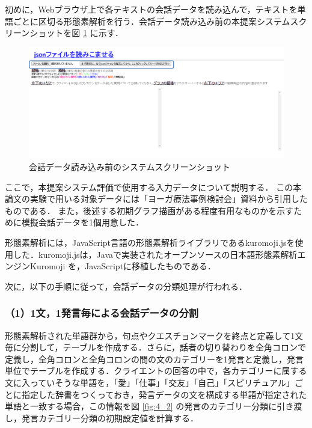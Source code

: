 \documentclass[shuuron]{kuee}
\begin{document}
初めに，Webブラウザ上で各テキストの会話データを読み込んで，テキストを単語ごとに区切る形態素解析を行う．会話データ読み込み前の本提案システムスクリーンショットを図
\ref{fig:yomikomimae2}
に示す．
\begin{figure}
  \begin{center}
    \includegraphics[width=\linewidth]{yomikomimae2.png}
  \end{center}
  \caption{会話データ読み込み前のシステムスクリーンショット}
  \label{fig:yomikomimae2}
\end{figure}

ここで，本提案システム評価で使用する入力データについて説明する．
この本論文の実験で用いる対象データには「ヨーガ療法事例検討会」資料から引用したものである．
また，後述する初期グラフ描画がある程度有用なものかを示すために模擬会話データを1個用意した．

形態素解析には，JavaScript言語の形態素解析ライブラリであるkuromoji.js\cite{kuromojijs}を使用した．kuromoji.jsは，Javaで実装されたオープンソースの日本語形態素解析エンジンKuromoji
\cite{kuromoji}
を，JavaScriptに移植したものである．

次に，以下の手順に従って，会話データの分類処理が行われる．

\subsubsection{（1）1文，1発言毎による会話データの分割}%
形態素解析された単語群から，句点やクエスチョンマークを終点と定義して1文毎に分割して，テーブルを作成する．さらに，話者の切り替わりを全角コロンで定義し，全角コロンと全角コロンの間の文のカテゴリーを1発言と定義し，発言単位でテーブルを作成する．クライエントの回答の中で，各カテゴリーに属する文に入っていそうな単語を，「愛」「仕事」「交友」「自己」「スピリチュアル」ごとに指定した辞書をつくっておき，発言データの文を構成する単語が指定された単語と一致する場合，この情報を図
\ref{fig:4_2}
の発言のカテゴリー分類に引き渡し，発言カテゴリー分類の初期設定値を計算する．
\end{document}
